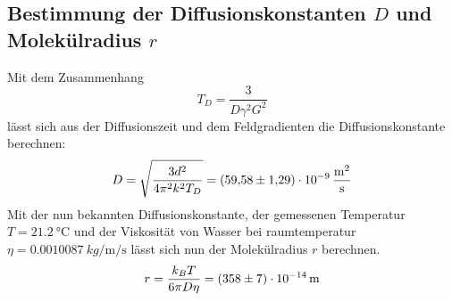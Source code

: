 \subsection{Bestimmung der Diffusionskonstanten $D$ und Molekülradius $r$}
Mit dem Zusammenhang 
\begin{equation*}
    T_D = \frac{3}{D \gamma^2 G^2}
\end{equation*}
lässt sich aus der Diffusionszeit und dem Feldgradienten die Diffusionskonstante berechnen:
\begin{equation*}
    D = \sqrt{\frac{3d^2}{4\pi^2k^2T_D}} = \SI{59.58 +- 1.29 E-09}{\metre \squared  \per \second}
\end{equation*}
Mit der nun bekannten Diffusionskonstante, der gemessenen Temperatur $T = \SI{21.2}{\celsius}$ und der Viskosität von Wasser bei raumtemperatur $\eta = \SI{0.0010087}{kg\per\metre\per\second}$ lässt sich nun der Molekülradius $r$ berechnen.
\begin{equation*}
    r = \frac{k_B T}{6\pi D \eta} = \SI{358 +- 7 E-14}{\metre}
\end{equation*}